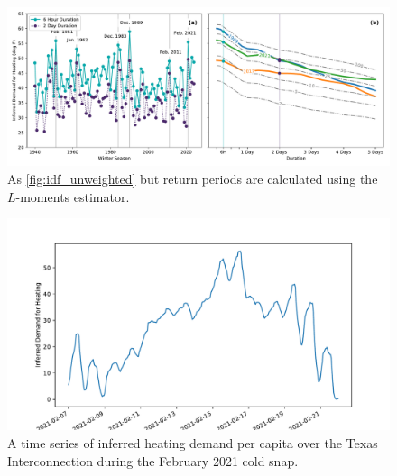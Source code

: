 \documentclass[12pt]{iopart}
\begin{document}
\begin{figure}
  \centering
  \includegraphics[width=\textwidth]{ERCOT_HDD_IDF_plotpos_unweighted.pdf}
  \caption{
    As \cref{fig:idf_unweighted} but return periods are calculated using the $L$-moments estimator.
  }\label{fig:idf_lmoments_unweighted}
\end{figure}

\begin{figure}
  \centering
  \includegraphics[width=\textwidth]{HDD_pop_weighted_ts.pdf}
  \caption{
    A time series of inferred heating demand per capita over the Texas Interconnection during the February 2021 cold snap.
  }\label{fig:hdd_ts}
\end{figure}
\end{document}
